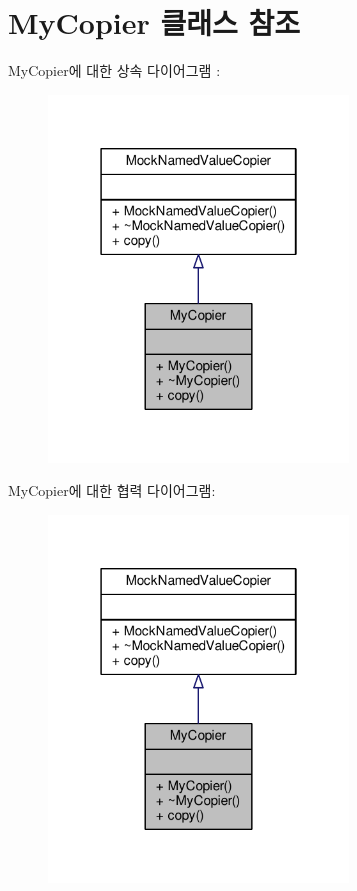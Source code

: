 \hypertarget{class_my_copier}{}\section{My\+Copier 클래스 참조}
\label{class_my_copier}


My\+Copier에 대한 상속 다이어그램 \+: 
\nopagebreak
\begin{figure}[H]
\begin{center}
\leavevmode
\includegraphics[width=226pt]{class_my_copier__inherit__graph}
\end{center}
\end{figure}


My\+Copier에 대한 협력 다이어그램\+:
\nopagebreak
\begin{figure}[H]
\begin{center}
\leavevmode
\includegraphics[width=226pt]{class_my_copier__coll__graph}
\end{center}
\end{figure}
